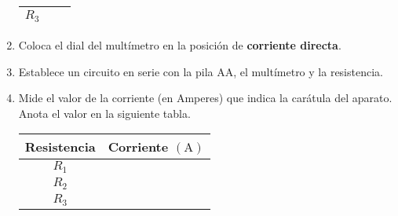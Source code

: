 \documentclass[14pt]{extarticle}
\begin{document}
\begin{enumerate}
\begin{table}[H]
\begin{tabular}{| c | c | c |}
$R_{3}$ & & \\ \hline
\end{tabular}
\end{table}
\item Coloca el dial del multímetro en la posición de \textbf{corriente directa}.
\item Establece un circuito en serie con la pila AA, el multímetro y la resistencia.
\item Mide el valor de la corriente (en Amperes) que indica la carátula del aparato. Anota el valor en la siguiente tabla.
\begin{table}[H]
\centering
\begin{tabular}{| c | c | } \hline
Resistencia & Corriente $(\si{\ampere})$ \\ \hline
$R_{1}$ & \\ \hline
$R_{2}$ & \\ \hline
$R_{3}$ & \\ \hline
\end{tabular}
\end{table}
\end{enumerate}
\end{document}
